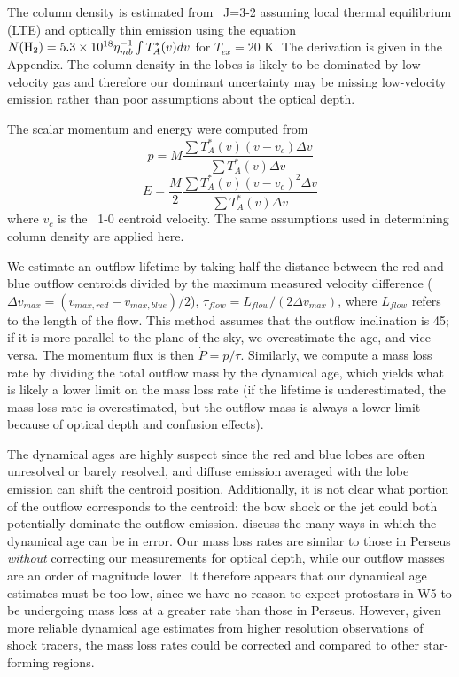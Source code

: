 The column density is estimated from \twelveco\ J=3-2  assuming local thermal
equilibrium (LTE) and optically thin emission using the equation 
$ N(\textrm{H}_{2}) =
5.3\times10^{18}\eta_{mb}^{-1} \int T_A^*(v) dv $ for $T_{ex}=20$ K. 
The derivation is given in the Appendix.
The column density in the lobes is likely to be dominated by low-velocity gas
and therefore our dominant uncertainty may be missing low-velocity emission
rather than poor assumptions about the optical depth.

The scalar momentum and energy were computed from
\begin{equation}
      p = M \frac{\sum T_A^*(v) (v-v_{c}) \Delta v}{ \sum T_A^*(v) \Delta v}
\end{equation}
\begin{equation}
      E = \frac{M}{2} \frac{\sum T_A^*(v) (v-v_{c})^2 \Delta v}{ \sum T_A^*(v) \Delta v}
\end{equation}
where $v_c$ is the \thirteenco\ 1-0 centroid velocity.  The same 
assumptions used in determining column density are applied here.

We
estimate an outflow lifetime by taking half the distance between the red and
blue outflow centroids divided by the maximum measured velocity difference
($\Delta v_{max} = (v_{max,red}-v_{max,blue})/2$), $\tau_{flow} = L_{flow} / ( 2 \Delta
v_{max})$, where $L_{flow}$ refers to the length of the flow.  This method
assumes that the outflow inclination is 45\arcdeg; if it is more parallel to
the plane of the sky, we overestimate the age, and vice-versa.  The momentum
flux is then $\dot{P} = p / \tau$.  Similarly, we compute a mass loss rate by
dividing the total outflow mass by the dynamical age, which yields what is
likely a lower limit on the mass loss rate (if the lifetime is underestimated,
the mass loss rate is overestimated, but the outflow mass is always a lower
limit because of optical depth and confusion effects).    

The dynamical ages are highly suspect since the red and blue lobes are often
unresolved or barely resolved, and diffuse emission averaged with the lobe
emission can shift the centroid position.  Additionally, it is not clear what
portion of the outflow corresponds to the centroid: the bow shock or the jet could both potentially
dominate the outflow emission.  \citet{curtis2010} discuss the many ways in
which the dynamical age can be in error.  
Our mass loss rates are similar to those in Perseus \emph{without} correcting our 
measurements for optical depth, while our outflow masses are an order of magnitude lower.
It therefore appears that our dynamical age estimates must be too low, since we have no 
reason to expect protostars in W5 to be undergoing mass loss at a greater rate than those in
Perseus.
However, given more reliable
dynamical age estimates from higher resolution observations of shock tracers,
the mass loss rates could be corrected and compared to other star-forming
regions.

